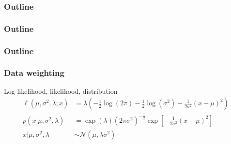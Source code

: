 \documentclass{beamer}
\begin{document}
\begin{frame}
\frametitle{Outline}
\tableofcontents
\end{frame}


\begin{frame}
\frametitle{Outline}
\tableofcontents
\end{frame}


\begin{frame}
\frametitle{Outline}
\tableofcontents
\end{frame}


\begin{frame}
\frametitle{Data weighting}

Log-likelihood, likelihood, distribution
\begin{align*}
  \ell (\mu, \sigma^2, \lambda; x) &= \lambda \left( -\frac{1}{2} \log (2 \pi) - \frac{1}{2}
  \log (\sigma^2) - \frac{1}{2 \sigma^2} (x - \mu)^2 \right)\\
  p(x|\mu, \sigma^2, \lambda) &= \exp(\lambda) \left( 2 \pi \sigma^2 \right)^{-\frac{1}{2}} \exp \left[ -\frac{1}{2
      \sigma^2} (x - \mu)^2 \right]\\
  x|\mu, \sigma^2, \lambda &\sim \mathcal{N} \left( \mu, \lambda \sigma^2 \right)
\end{align*}
\end{frame}

\end{document}
